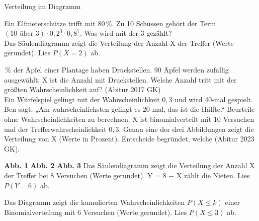 \setcounter{aufgabe}{21}

\begin{aufgabe}{Verteilung im Diagramm}
\begin{teile}
\teil Ein Elfmeterschütze trifft mit 80\,\%. Zu 10 Schüssen gehört der Term $(10 \text{ über } 3) \cdot 0{,}2^3 \cdot 0{,}8^7$. Was wird mit der 3 gezählt?  \\ 
\teil Das Säulendiagramm zeigt die Verteilung der Anzahl X der Treffer (Werte gerundet). Lies $P(X = 2)$ ab.

\leerfeld
{}\,\% der Äpfel einer Plantage haben Druckstellen. 90 Äpfel werden zufällig ausgewählt; X ist die Anzahl mit Druckstellen. Welche Anzahl tritt mit der größten Wahrscheinlichkeit auf? \hfill (Abitur 2017 GK) \\ \leerfeld
\teil Ein Würfelspiel gelingt mit der Wahrscheinlichkeit $0{,}3$ und wird 40-mal gespielt. Ben sagt: „Am wahrscheinlichsten gelingt es 20-mal, das ist die Hälfte.“ Beurteile ohne Wahrscheinlichkeiten zu berechnen.
\teil X ist binomialverteilt mit 10 Versuchen und der Trefferwahrscheinlichkeit $0{,}3$. Genau eine der drei Abbildungen zeigt die Verteilung von X (Werte in Prozent). Entscheide begründet, welche \hfill (Abitur 2023 GK).

\textbf{Abb. 1}  \quad \textbf{Abb. 2}  \quad \textbf{Abb. 3} 
\teil Das Säulendiagramm zeigt die Verteilung der Anzahl X der Treffer bei 8 Versuchen (Werte gerundet). Y = 8 − X zählt die Nieten. Lies $P(Y = 6)$ ab.

\leerfeld
\teil Das Diagramm zeigt die kumulierten Wahrscheinlichkeiten $P(X \le k)$ einer Binomialverteilung mit 6 Versuchen (Werte gerundet). Lies $P(X \le 3)$ ab.


\end{teile}
\end{aufgabe}
